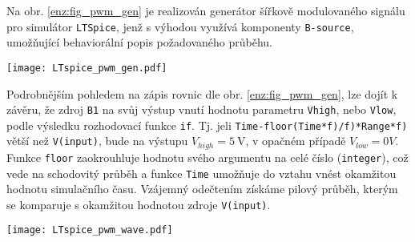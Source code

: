 \begin{example}\label{AES:exam003}
  Na obr. \ref{enz:fig_pwm_gen} je realizován generátor šířkově modulovaného signálu pro
  simulátor \texttt{LTSpice}, jenž s výhodou využívá komponenty \texttt{B-source}, umožňující
  behaviorální popis požadovaného průběhu.

   {\centering
    \captionsetup{type=figure} 
    \texttt{[image: LTspice\_pwm\_gen.pdf]}
    \label{enz:fig_pwm_gen}
  \par}
  Podrobnějším pohledem na zápis rovnic dle obr. \ref{enz:fig_pwm_gen}, lze dojít k závěru, že
  zdroj \texttt{B1} na svůj výstup vnutí hodnotu parametru \texttt{Vhigh}, nebo \texttt{Vlow},
  podle výsledku rozhodovací funkce \texttt{if}. Tj. jeli \texttt{Time-floor(Time*f)/f)*Range*f)} 
  větší než \texttt{V(input)}, bude na výstupu $V_{high}= \SI{5}{\volt}$, v opačném případě 
  $V_{low} = 0V$. Funkce \texttt{floor} zaokrouhluje hodnotu svého argumentu na celé číslo 
  (\texttt{integer}), což vede na schodovitý průběh a funkce \texttt{Time} umožňuje do vztahu vnést 
  okamžitou hodnotu simulačního času. Vzájemný odečtením získáme pilový průběh, kterým se komparuje 
  s okamžitou hodnotou zdroje \texttt{V(input)}.

    {\centering
     \captionsetup{type=figure} 
     \texttt{[image: LTspice\_pwm\_wave.pdf]}
     \label{enz:fig_pwm_wave}
   \par}       
\end{example} 